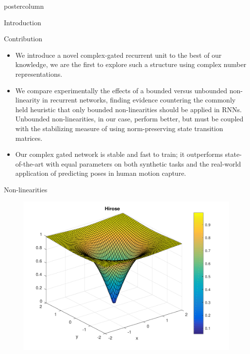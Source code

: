 \documentclass{beamer}
\begin{document}
\begin{frame}
\begin{columns}
\begin{column}{.43\textwidth}
\begin{beamercolorbox}[center]{postercolumn}
\begin{minipage}{.98\textwidth}
{\begin{myblock}{Introduction}
                    \end{myblock}\vfill
                    \begin{myblock}{Contribution}
                            \begin{itemize}
                                \item We introduce a novel complex-gated recurrent unit to the best of our knowledge, we are the first to explore such a structure using complex number representations.  
                                \item We compare experimentally the effects of a bounded versus unbounded non-linearity in recurrent networks, finding evidence countering the commonly held heuristic that only bounded non-linearities should be applied in RNNs.  Unbounded non-linearities, in our case, perform better, but must be coupled with the stabilizing measure of using norm-preserving state transition matrices.
                                \item Our complex gated network is stable and fast to train; it outperforms state-of-the-art with equal parameters on both synthetic tasks and the real-world application of predicting poses in human motion capture.   
                            \end{itemize}
                    \end{myblock}\vfill
                    \begin{myblock}{Non-linearities}
                            \vspace{0.25em}
                            \begin{figure}
                                \begin{minipage}{0.43\textwidth}
                                    \centering\includegraphics[width=1.0\textwidth]{img/Hirose_slice}

\end{minipage}
\end{figure}
\end{myblock}}
\end{minipage}
\end{beamercolorbox}
\end{column}
\end{columns}
\end{frame}
\end{document}
